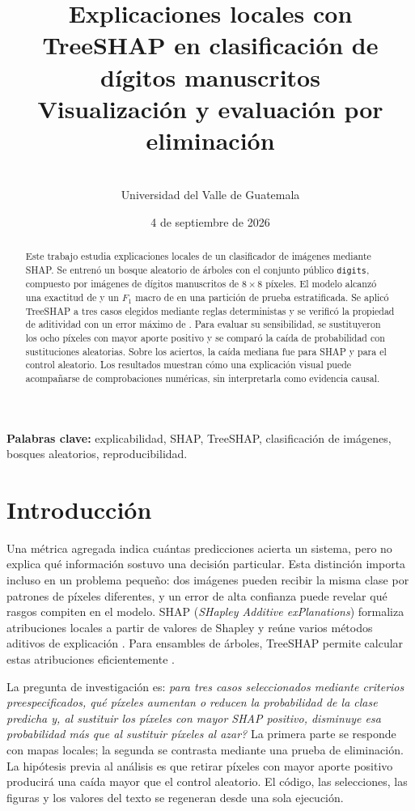 \documentclass[11pt,letterpaper]{article}
\title{\textbf{Explicaciones locales con TreeSHAP en clasificación de dígitos manuscritos}\\
\large Visualización y evaluación por eliminación}
\author{\StudentName\\Universidad del Valle de Guatemala}
\date{4 de septiembre de 2026}
\begin{document}
\maketitle

\begin{abstract}
Este trabajo estudia explicaciones locales de un clasificador de imágenes mediante
SHAP. Se entrenó un bosque aleatorio de \NumTrees{} árboles con el conjunto público
\texttt{digits}, compuesto por \DatasetSize{} imágenes de dígitos manuscritos de
$8\times8$ píxeles. El modelo alcanzó una exactitud de \TestAccuracy{} y un
$F_1$ macro de \MacroFOne{} en una partición de prueba estratificada. Se aplicó
TreeSHAP a tres casos elegidos mediante reglas deterministas y se verificó la
propiedad de aditividad con un error máximo de \MaxAdditivityError. Para evaluar
su sensibilidad, se sustituyeron los ocho píxeles con mayor aporte
positivo y se comparó la caída de probabilidad con sustituciones aleatorias. Sobre
los \CorrectTestCases{} aciertos, la caída mediana fue \MedianShapDrop{} para SHAP
y \MedianRandomDrop{} para el control aleatorio. Los resultados muestran cómo una
explicación visual puede acompañarse de comprobaciones numéricas, sin interpretarla
como evidencia causal.
\end{abstract}

\textbf{Palabras clave:} explicabilidad, SHAP, TreeSHAP, clasificación de imágenes,
bosques aleatorios, reproducibilidad.

\section{Introducción}

Una métrica agregada indica cuántas predicciones acierta un sistema, pero no explica
qué información sostuvo una decisión particular. Esta distinción importa incluso en
un problema pequeño: dos imágenes pueden recibir la misma clase por patrones de
píxeles diferentes, y un error de alta confianza puede revelar qué rasgos compiten
en el modelo. SHAP (\emph{SHapley Additive exPlanations}) formaliza atribuciones
locales a partir de valores de Shapley y reúne varios métodos aditivos de explicación
\citep{shapley1953value,lundberg2017unified}. Para ensambles de árboles, TreeSHAP
permite calcular estas atribuciones eficientemente \citep{lundberg2020local}.

La pregunta de investigación es: \emph{para tres casos seleccionados mediante criterios
preespecificados, qué píxeles aumentan o reducen la probabilidad de la clase predicha y,
al sustituir los píxeles con mayor SHAP positivo, disminuye esa probabilidad más que
al sustituir píxeles al azar?} La primera parte se responde con mapas locales; la
segunda se contrasta mediante una prueba de eliminación. La hipótesis previa al
análisis es que retirar píxeles con mayor aporte positivo producirá una caída mayor
que el control aleatorio. El código, las selecciones, las figuras y los valores del
texto se regeneran desde una sola ejecución.
\end{document}

